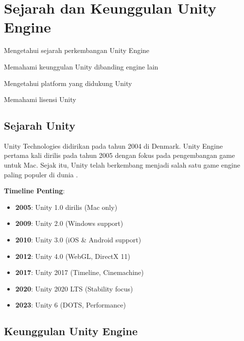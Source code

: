 
\section{Sejarah dan Keunggulan Unity Engine}

\begin{learningoutcomes}
\item Mengetahui sejarah perkembangan Unity Engine
\item Memahami keunggulan Unity dibanding engine lain
\item Mengetahui platform yang didukung Unity
\item Memahami lisensi Unity
\end{learningoutcomes}

\subsection{Sejarah Unity}

Unity Technologies didirikan pada tahun 2004 di Denmark. Unity Engine pertama kali dirilis pada tahun 2005 dengan fokus pada pengembangan game untuk Mac. Sejak itu, Unity telah berkembang menjadi salah satu game engine paling populer di dunia \cite{UnityManual2024}.

\textbf{Timeline Penting}:
\begin{itemize}
    \item \textbf{2005}: Unity 1.0 dirilis (Mac only)
    \item \textbf{2009}: Unity 2.0 (Windows support)
    \item \textbf{2010}: Unity 3.0 (iOS \& Android support)
    \item \textbf{2012}: Unity 4.0 (WebGL, DirectX 11)
    \item \textbf{2017}: Unity 2017 (Timeline, Cinemachine)
    \item \textbf{2020}: Unity 2020 LTS (Stability focus)
    \item \textbf{2023}: Unity 6 (DOTS, Performance)
\end{itemize}

\subsection{Keunggulan Unity Engine}

